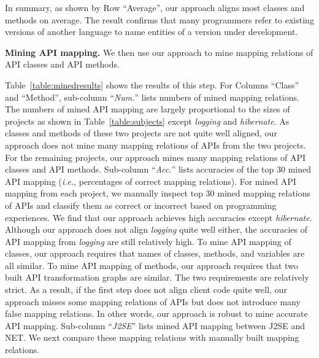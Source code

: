 In summary, as shown by Row ``Average'', our approach aligns most
classes and methods on average. The result confirms that many
programmers refer to existing versions of another language to name
entities of a version under development.

\textbf{Mining API mapping.} We then use our approach to mine
mapping relations of API classes and API methods.

Table~\ref{table:minedresults} shows the results of this step. For
Columns ``Class'' and ``Method'', sub-column ``\emph{Num.}'' lists
numbers of mined mapping relations. The numbers of mined API mapping
are largely proportional to the sizes of projects as shown in
Table~\ref{table:subjects} except \emph{logging} and
\emph{hibernate}. As classes and methods of these two projects are
not quite well aligned, our approach does not mine many mapping
relations of APIs from the two projects. For the remaining projects,
our approach mines many mapping relations of API classes and API
methods. Sub-column ``\emph{Acc.}'' lists accuracies of the top 30
mined API mapping (\emph{i.e.}, percentages of correct mapping
relations). For mined API mapping from each project, we manually
inspect top 30 mined mapping relations of APIs and classify them as
correct or incorrect based on programming experiences. We find that
our approach achieves high accuracies except \emph{hibernate}.
Although our approach does not align \emph{logging} quite well
either, the accuracies of API mapping from \emph{logging} are still
relatively high. To mine API mapping of classes, our approach
requires that names of classes, methods, and variables are all
similar. To mine API mapping of methods, our approach requires that
two built API transformation graphs are similar. The two
requirements are relatively strict. As a result, if the first step
does not align client code quite well, our approach misses some
mapping relations of APIs but does not introduce many false mapping
relations. In other words, our approach is robust to mine accurate
API mapping. Sub-column ``\emph{J2SE}'' lists mined API mapping
between J2SE and NET. We next compare these mapping relations with
manually built mapping relations.

